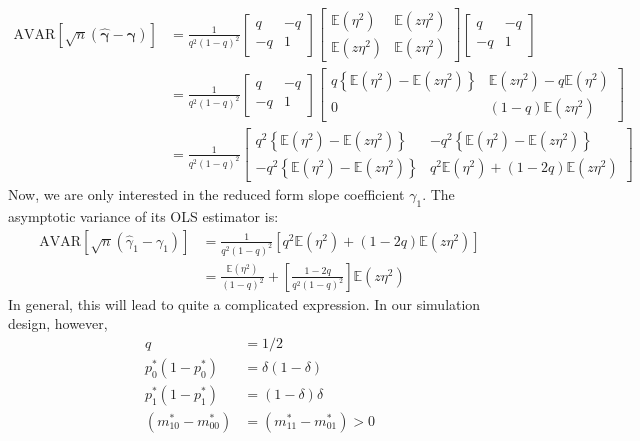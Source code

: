 \documentclass[12pt]{article}
\begin{document}
\begin{align*}
  \mbox{AVAR}\left[ \sqrt{n}\left( \widehat{\boldsymbol{\gamma}} - \boldsymbol{\gamma}\right) \right] &= \frac{1}{q^2(1-q)^2}
  \left[
  \begin{array}{cc}
    q & -q \\ -q & 1
  \end{array}
\right]
\left[
\begin{array}{cc}
  \mathbb{E}(\eta^2) & \mathbb{E}(z\eta^2)\\
  \mathbb{E}(z\eta^2) & \mathbb{E}(z\eta^2)
\end{array}
\right]
\left[
\begin{array}{cc}
  q & -q \\ -q & 1
\end{array}
\right]\\
&= 
\frac{1}{q^2(1-q)^2}
\left[
\begin{array}{cc}
  q & -q \\ -q & 1
\end{array}
\right]
\left[
\begin{array}{cc}
  q\left\{ \mathbb{E}(\eta^2) - \mathbb{E}(z\eta^2) \right\} &
  \mathbb{E}(z\eta^2) - q \mathbb{E}(\eta^2)\\
  0 & (1-q)\mathbb{E}(z\eta^2)
\end{array}
\right] \\ 
&= 
\frac{1}{q^2(1-q)^2}
\left[
\begin{array}{cc}
  q^2 \left\{ \mathbb{E}(\eta^2) - \mathbb{E}(z\eta^2) \right\} & 
  -q^2 \left\{ \mathbb{E}(\eta^2) - \mathbb{E}(z\eta^2) \right\} \\
  -q^2 \left\{ \mathbb{E}(\eta^2) - \mathbb{E}(z\eta^2) \right\} &
  q^2 \mathbb{E}(\eta^2) + (1-2q) \mathbb{E}(z\eta^2)
\end{array}
\right]
\end{align*}
Now, we are only interested in the reduced form slope coefficient $\gamma_1$.
The asymptotic variance of its OLS estimator is:
\begin{align*}
  \mbox{AVAR}\left[ \sqrt{n}(\widehat{\gamma}_1 - \gamma_1) \right] &= 
  \frac{1}{q^2(1-q)^2}\left[q^2 \mathbb{E}(\eta^2) + (1-2q) \mathbb{E}(z\eta^2)\right]\\
  &= \frac{\mathbb{E}(\eta^2)}{(1-q)^2} + \left[ \frac{1-2q}{q^2(1-q)^2} \right]\mathbb{E}(z\eta^2)
\end{align*}
In general, this will lead to quite a complicated expression.
In our simulation design, however, 
\begin{align*}
  q &= 1/2\\ 
  p^*_0(1-p^*_0) &= \delta(1-\delta)\\
  p^*_1(1-p^*_1) &= (1 -\delta) \delta\\
  (m^*_{10} - m^*_{00}) &= (m^*_{11} - m_{01}^*) > 0 
\end{align*}
\end{document}
